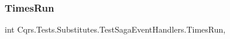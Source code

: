 \subsubsection{\texorpdfstring{Times\+Run}{TimesRun}}
{\footnotesize\ttfamily int Cqrs.\+Tests.\+Substitutes.\+Test\+Saga\+Event\+Handlers.\+Times\+Run\hspace{0.3cm}{\ttfamily [get]}, {\ttfamily [set]}}

